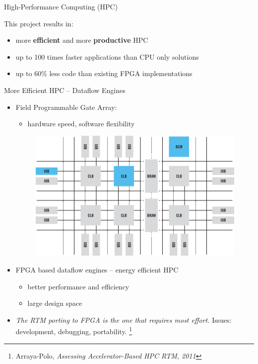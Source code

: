 \begin{frame}{High-Performance Computing (HPC)}
  \begin{beamerboxesrounded}{This project results in:}
    \begin{itemize}
    \item more \textbf{efficient} and more \textbf{productive} HPC
    \item up to 100 times faster applications than CPU only solutions
    \item up to 60\% less code than existing FPGA implementations
    \end{itemize}
  \end{beamerboxesrounded}
\end{frame}


\begin{frame}{More Efficient HPC -- Dataflow Engines}
\begin{itemize}
 \item Field Programmable Gate Array:
   \begin{itemize}
     \item hardware speed, software flexibility
   \end{itemize}
 \begin{figure}[!ht]
   \includegraphics[scale=0.3, clip=true, trim=0 270 295 110]{figs/fpga-block-structure.png}
  \end{figure}
\hspace{0.25cm}
  \item FPGA based dataflow engines -- energy efficient HPC
  \begin{itemize}
  \item better performance and efficiency
  \item large design space
  \end{itemize}
\hspace{0.25cm}

\item \emph{The RTM porting to FPGA is the one that requires most
    effort.} Issues: development, debugging, portability. \footnote{Arraya-Polo, \emph{Assessing Accelerator-Based
HPC RTM, 2011}
}
\end{itemize}
\end{frame}

